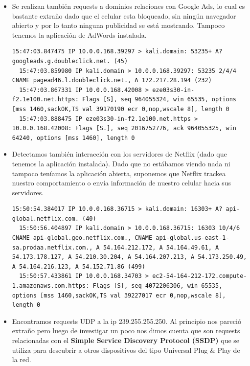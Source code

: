 \begin{itemize}
\item Se realizan también requests a dominios relaciones con Google Ads, lo cual es bastante extraño dado que el celular esta bloqueado, 
sin ningún navegador abierto y por lo tanto ninguna publicidad se está mostrando. Tampoco tenemos la aplicación de AdWords instalada.

\begin{lstlisting}[style=base]
  15:47:03.847475 IP 10.0.0.168.39297 > kali.domain: 53235+ A? googleads.g.doubleclick.net. (45)
  15:47:03.859980 IP kali.domain > 10.0.0.168.39297: 53235 2/4/4 CNAME pagead46.l.doubleclick.net., A 172.217.28.194 (232)
  15:47:03.867331 IP 10.0.0.168.42008 > eze03s30-in-f2.1e100.net.https: Flags [S], seq 964055324, win 65535, options [mss 1460,sackOK,TS val 39170190 ecr 0,nop,wscale 8], length 0
  15:47:03.888475 IP eze03s30-in-f2.1e100.net.https > 10.0.0.168.42008: Flags [S.], seq 2016752776, ack 964055325, win 64240, options [mss 1460], length 0
\end{lstlisting}

\item Detectamos también interacción con los servidores de Netflix (dado que tenemos la aplicación instalada). Dado que no estábamos 
viendo nada ni tampoco teníamos la aplicación abierta, suponemos que Netflix trackea nuestro comportamiento o envía información de 
nuestro celular hacia sus servidores.

\begin{lstlisting}[style=base]
  15:50:54.384017 IP 10.0.0.168.36715 > kali.domain: 16303+ A? api-global.netflix.com. (40)
  15:50:56.404897 IP kali.domain > 10.0.0.168.36715: 16303 10/4/6 CNAME api-global.geo.netflix.com., CNAME api-global.us-east-1-sa.prodaa.netflix.com., A 54.164.212.172, A 54.164.49.61, A 54.173.178.127, A 54.210.30.204, A 54.164.207.213, A 54.173.250.49, A 54.164.216.123, A 54.152.71.86 (499)
  15:50:57.433861 IP 10.0.0.168.34703 > ec2-54-164-212-172.compute-1.amazonaws.com.https: Flags [S], seq 4072206306, win 65535, options [mss 1460,sackOK,TS val 39227017 ecr 0,nop,wscale 8], length 0
\end{lstlisting}

\item Encontramos requests UDP a la ip 239.255.255.250. Al principio nos pareció extraño pero luego de investigar un poco nos dimos cuenta 
que son requests relacionadas con el \textbf{Simple Service Discovery Protocol (SSDP)} que se utiliza para descubrir a otros dispositivos 
del tipo Universal Plug \& Play de la red.


\end{itemize}
